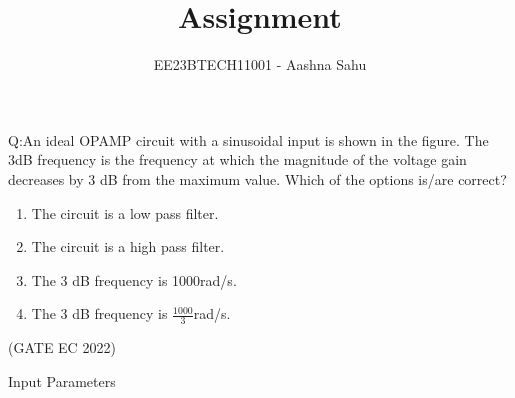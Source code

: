 \documentclass[journal,12pt,twocolumn]{IEEEtran}
\theoremstyle{remark}
\begin{document}
\let\vec\mathbf



\vspace{3cm}
\title{Assignment}
\author{EE23BTECH11001 - Aashna Sahu}
\maketitle
\bigskip

\renewcommand{\thefigure}{\theenumi}
\renewcommand{\thetable}{\theenumi}

Q:An ideal OPAMP circuit with a sinusoidal input is shown in the figure. The 3dB frequency is the frequency at which the magnitude of the voltage gain decreases by 3 dB from the maximum value. Which of the options is/are correct?

\begin{figure}[H]
  \centering
  
  \label{fig:26fig1}
\end{figure}



\begin{enumerate}[label=(\Alph*)]
\item The circuit is a low pass filter.\\
\item The circuit is a high pass filter.\\
\item The 3 dB frequency is 1000rad/s.\\
\item The 3 dB frequency is $\frac{1000}{3}$rad/s.\\
\end{enumerate}
\hfill(GATE EC 2022)

\solution
\fi
\begin{table}[ht]
  \centering
  
  \caption{Input Parameters}
  \label{tab:26tab1}
\end{table}

\begin{figure}[H]
  \centering
  
  \label{fig:26fig2}
\end{figure}
\end{document}
